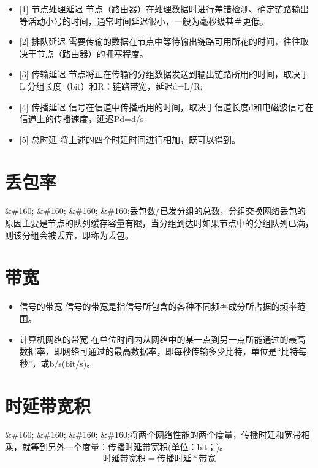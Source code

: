 \begin{itemize}
\item {[1]} 节点处理延迟
节点（路由器）在处理数据时进行差错检测、确定链路输出等活动小号的时间，通常时间延迟很小，一般为毫秒级甚至更低。

\item {[2]} 排队延迟
需要传输的数据在节点中等待输出链路可用所花的时间，往往取决于节点（路由器）的拥塞程度。

\item {[3]} 传输延迟
节点将正在传输的分组数据发送到输出链路所用的时间，取决于L:分组长度（bit）和R：链路带宽，延迟d=L\slash R;

\item {[4]} 传播延迟
信号在信道中传播所用的时间，取决于信道长度d和电磁波信号在信道上的传播速度，延迟Pd=d\slash s

\item {[5]} 总时延
将上述的四个时延时间进行相加，既可以得到。

\end{itemize}

\section{丢包率}
\label{丢包率}

\&\#160; \&\#160; \&\#160; \&\#160;丢包数\slash 已发分组的总数，分组交换网络丢包的原因主要是节点的队列缓存容量有限，当分组到达时如果节点中的分组队列已满，则该分组会被丢弃，即称为丢包。

\section{带宽}
\label{带宽}

\begin{itemize}
\item 信号的带宽
信号的带宽是指信号所包含的各种不同频率成分所占据的频率范围。

\item 计算机网络的带宽
在单位时间内从网络中的某一点到另一点所能通过的最高数据率，即网络可通过的最高数据率，即每秒传输多少比特，单位是“比特每秒”，或b\slash s(bit\slash s)。

\end{itemize}

\section{时延带宽积}
\label{时延带宽积}

\&\#160; \&\#160; \&\#160; \&\#160;将两个网络性能的两个度量，传播时延和宽带相乘，就等到另外一个度量：传播时延带宽积(单位：bit；)。
$$时延带宽积=传播时延*带宽$$

